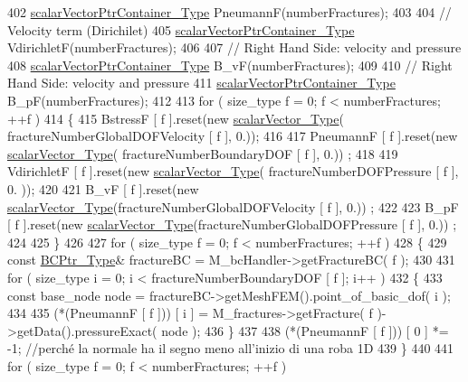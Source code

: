 \begin{DoxyCode}
402     \hyperlink{Core_8h_a20f0354ac7b92989514c678f4cdfcb6b}{scalarVectorPtrContainer\_Type} PneumannF(numberFractures);
403 
404     \textcolor{comment}{// Velocity term (Dirichilet)}
405     \hyperlink{Core_8h_a20f0354ac7b92989514c678f4cdfcb6b}{scalarVectorPtrContainer\_Type} VdirichletF(numberFractures);
406 
407     \textcolor{comment}{// Right Hand Side: velocity and pressure}
408     \hyperlink{Core_8h_a20f0354ac7b92989514c678f4cdfcb6b}{scalarVectorPtrContainer\_Type} B\_vF(numberFractures);
409 
410     \textcolor{comment}{// Right Hand Side: velocity and pressure}
411     \hyperlink{Core_8h_a20f0354ac7b92989514c678f4cdfcb6b}{scalarVectorPtrContainer\_Type} B\_pF(numberFractures);
412     
413     \textcolor{keywordflow}{for} ( size\_type f = 0; f < numberFractures; ++f )
414     \{
415         BstressF [ f ].reset(\textcolor{keyword}{new} \hyperlink{Core_8h_a4e75b5863535ba1dd79942de2846eff0}{scalarVector\_Type}( fractureNumberGlobalDOFVelocity [ f ],
       0.));
416 
417         PneumannF [ f ].reset(\textcolor{keyword}{new} \hyperlink{Core_8h_a4e75b5863535ba1dd79942de2846eff0}{scalarVector\_Type}( fractureNumberBoundaryDOF [ f ], 0.))
      ;
418 
419         VdirichletF [ f ].reset(\textcolor{keyword}{new} \hyperlink{Core_8h_a4e75b5863535ba1dd79942de2846eff0}{scalarVector\_Type}( fractureNumberDOFPressure [ f ], 0.
      ));
420 
421         B\_vF [ f ].reset(\textcolor{keyword}{new} \hyperlink{Core_8h_a4e75b5863535ba1dd79942de2846eff0}{scalarVector\_Type}(fractureNumberGlobalDOFVelocity [ f ], 0.))
      ;
422 
423         B\_pF [ f ].reset(\textcolor{keyword}{new} \hyperlink{Core_8h_a4e75b5863535ba1dd79942de2846eff0}{scalarVector\_Type}(fractureNumberGlobalDOFPressure [ f ], 0.))
      ;
424         
425     \}
426 
427     \textcolor{keywordflow}{for} ( size\_type f = 0; f < numberFractures; ++f )
428     \{
429         \textcolor{keyword}{const} \hyperlink{BC_8h_a088c36f945ad8f6e7e0c7c423994c6ec}{BCPtr\_Type}& fractureBC = M\_bcHandler->getFractureBC( f );
430 
431         \textcolor{keywordflow}{for} ( size\_type i = 0; i < fractureNumberBoundaryDOF [ f ]; i++ )
432         \{
433             \textcolor{keyword}{const} base\_node node = fractureBC->getMeshFEM().point\_of\_basic\_dof( i );
434 
435             (*(PneumannF [ f ])) [ i ] = M\_fractures->getFracture( f )->getData().pressureExact( node );
436         \}
437 
438         (*(PneumannF [ f ])) [ 0 ] *= -1; \textcolor{comment}{//perché la normale ha il segno meno all'inizio di una roba 1D}
439     \}
440 
441     \textcolor{keywordflow}{for} ( size\_type f = 0; f < numberFractures; ++f )

\end{DoxyCode}
